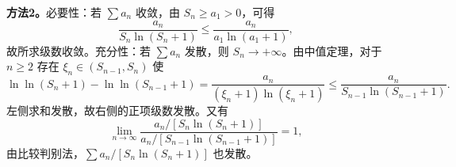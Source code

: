 \textbf{方法2。}必要性：若 $\sum a_n$ 收敛，由 $S_n\ge a_1>0$，可得
\[
\frac{a_n}{S_n\ln(S_n+1)}
\le\frac{a_n}{a_1\ln(a_1+1)},
\]
故所求级数收敛。充分性：若 $\sum a_n$ 发散，则 $S_n\to+\infty$。由中值定理，对于 $n\ge2$ 存在 $\xi_n\in(S_{n-1},S_n)$ 使
\[
\ln\ln(S_n+1)-\ln\ln(S_{n-1}+1)
=\frac{a_n}{(\xi_n+1)\ln(\xi_n+1)}
\le\frac{a_n}{S_{n-1}\ln(S_{n-1}+1)}.
\]
左侧求和发散，故右侧的正项级数发散。又有
\[
\lim_{n\to\infty}
\frac{a_n/[S_n\ln(S_n+1)]}
{a_n/[S_{n-1}\ln(S_{n-1}+1)]}=1,
\]
由比较判别法，$\sum a_n/[S_n\ln(S_n+1)]$ 也发散。


